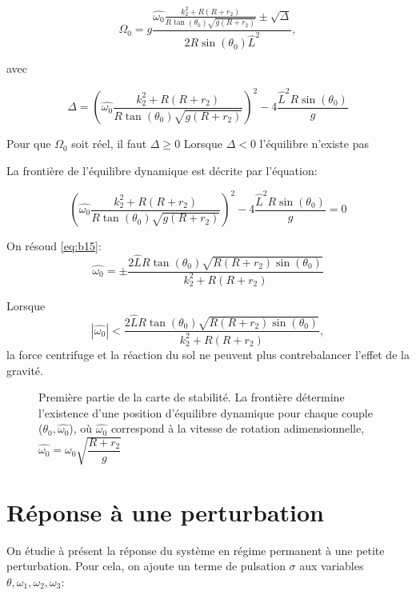 \begin{equation}
 \Omega_0=g \frac{\hat{\omega_0} \frac{k_2^2+R(R+r_2)}{R \tan(\theta_0) \sqrt{g(R+r_2)}}\pm \sqrt{\Delta}}{2R\sin(\theta_0)\hat{L}^2},
  \label{eq:b13}
\end{equation}

avec 

\begin{equation}
 \Delta=(\hat{\omega_0} \frac{k_2^2+R(R+r_2)}{R \tan(\theta_0) \sqrt{g(R+r_2)}})^2-4\frac{ \hat{L}^2 R \sin(\theta_0)}{g}
  \label{eq:b14}
\end{equation}

Pour que $\Omega_0$ soit réel, il faut $\Delta \geq 0$
Lorsque $\Delta < 0$ l'équilibre n'existe pas

La frontière de l'équilibre dynamique est décrite par l'équation:

\begin{equation}
(\hat{\omega_0} \frac{k_2^2+R(R+r_2)}{R \tan(\theta_0) \sqrt{g(R+r_2)}})^2-4\frac{ \hat{L}^2 R \sin(\theta_0)}{g} = 0
\label{eq:b15}
\end{equation}

On résoud \ref{eq:b15}:
\begin{equation}
 \hat{\omega_0}= \pm \frac{2\hat{L} R \tan(\theta_0) \sqrt{R(R+r_2)\sin(\theta_0)}}{k_2^2+R(R+r_2)}
  \label{eq:b16}
\end{equation}

Lorsque $$ |\hat{\omega_0}| < \frac{2\hat{L} R \tan(\theta_0) \sqrt{R(R+r_2)\sin(\theta_0)}}{k_2^2+R(R+r_2)},
$$
 la force centrifuge et la réaction du sol ne peuvent plus contrebalancer l'effet de la gravité.
 
\begin{figure}[h]
\centering
\def\svgwidth{370}

\caption{Première partie de la carte de stabilité. La frontière détermine l'existence d'une position d'équilibre dynamique pour chaque couple ($\theta_0,\hat{\omega_0}$), où $\hat{\omega_0}$ correspond à la vitesse de rotation adimensionnelle, $\hat{\omega_0}=\omega_0 \sqrt{\dfrac{R+r_2}{g}}$}
\end{figure}

\section{Réponse à une perturbation}

On étudie à présent la réponse du système en régime permanent à une petite perturbation. Pour cela, on ajoute un terme de pulsation $\sigma$ aux variables $\theta, \omega_1, \omega_2, \omega_3$: \\


